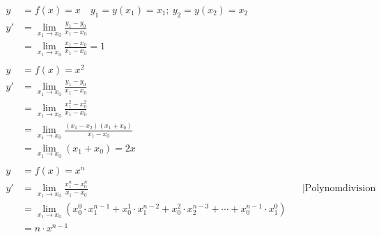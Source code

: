 \begin{align*}
	y  & = f(x) = x \quad y_1 = y(x_1) = x_1;\ y_2 = y(x_2) = x_2                                                                                                               \\
	y' & = \lim_{x_1 \rightarrow x_0} \frac{y_1 - y_0}{x_1 - x_0}                                                                                                               \\
	   & = \lim_{x_1 \rightarrow x_0} \frac{x_1 - x_0}{x_1 - x_0} = 1                                                                                                           \\
	\\
	y  & = f(x) = x^2                                                                                                                                                           \\
	y' & = \lim_{x_1 \rightarrow x_0} \frac{y_1 - y_0}{x_1 - x_0}                                                                                                               \\
	   & = \lim_{x_1 \rightarrow x_0} \frac{x_1^2 - x_0^2}{x_1 - x_0}                                                                                                           \\
	   & = \lim_{x_1 \rightarrow x_0} \frac{(x_1 - x_2)(x_1 + x_0)}{x_1 - x_0}                                                                                                  \\
	   & = \lim_{x_1 \rightarrow x_0} (x_1 + x_0) = 2x                                                                                                                          \\
	\\
	y  & = f(x) = x^n                                                                                                                                                           \\
	y' & = \lim_{x_1 \rightarrow x_0} \frac{x_1^n - x_0^n}{x_1 - x_0}                                                                          &  & \mid \text{Polynomdivision} \\
	   & = \lim_{x_1 \rightarrow x_0} (x_0^0 \cdot x_1^{n-1} + x_0^1 \cdot x_1^{n-2} + x_0^2 \cdot x_2^{n-3} + \cdots + x_0^{n-1} \cdot x_1^0)                                  \\
	   & = n \cdot x^{n-1}
\end{align*}

